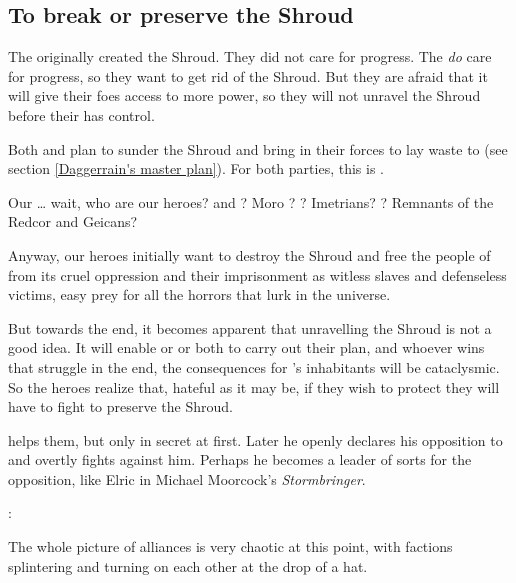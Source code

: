 \subsection{To break or preserve the Shroud}
The \dragons{} originally created the Shroud. They did not care for progress. The \resphain{} \emph{do} care for progress, so they want to get rid of the Shroud. But they are afraid that it will give their \draconic{} foes access to more \xsic{} power, so they will not unravel the Shroud before their \matrix{} has control. 

Both \Daggerrain{} and \Secherdamon{} plan to sunder the Shroud and bring in their forces to lay waste to \Miith{} (see section \ref{Daggerrain's master plan}). For both parties, this is .

Our \ldots{} wait, who are our heroes? \Narkiza{} and \Dzasselid? Moro \Cornel? \Cuezcans? Imetrians? \Ophidians? Remnants of the Redcor and Geicans?

Anyway, our heroes initially want to destroy the Shroud and free the people of \Miith{} from its cruel oppression and their imprisonment as witless slaves and defenseless victims, easy prey for all the horrors that lurk in the universe.

But towards the end, it becomes apparent that unravelling the Shroud is not a good idea. It will enable \Daggerrain{} or \Secherdamon{} or both to carry out their plan, and whoever wins that struggle in the end, the consequences for \Miith{}'s inhabitants will be cataclysmic. So the heroes realize that, hateful as it may be, if they wish to protect \Miith{} they will have to fight to preserve the Shroud.

\Ishnaruchaefir{} helps them, but only in secret at first. Later he openly declares his opposition to \Secherdamon{} and overtly fights against him. Perhaps he becomes a leader of sorts for the opposition, like Elric in Michael Moorcock's \emph{Stormbringer}.

\Ishnaruchaefir: 

The whole picture of alliances is very chaotic at this point, with factions splintering and turning on each other at the drop of a hat.

